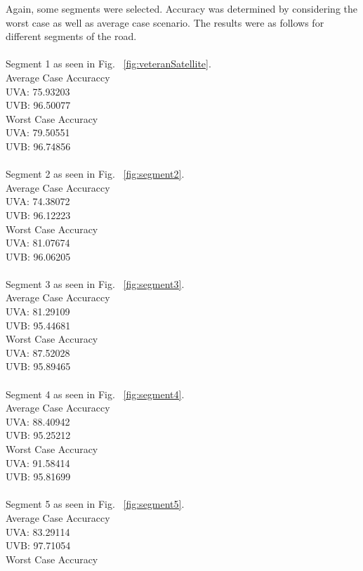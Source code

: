 \documentclass[12pt,fullpage,doublespace]{article}
\begin{document}
Again, some segments were selected. Accuracy was determined by considering the worst case as well as average case scenario. The results were as follows for different segments of the road. \\
\mbox{}\\
Segment 1 as seen in Fig. ~\ref{fig:veteranSatellite}. \\
Average Case Accuraccy\\
UVA:  75.93203\\
UVB:  96.50077\\
Worst Case Accuracy\\
UVA:  79.50551\\
UVB:  96.74856 \\
\mbox{}\\
Segment 2 as seen in Fig. ~\ref{fig:segment2}. \\
Average Case Accuraccy\\
UVA:  74.38072\\
UVB:  96.12223\\
Worst Case Accuracy\\
UVA:  81.07674\\
UVB:  96.06205\\
\mbox{}\\
Segment 3 as seen in Fig. ~\ref{fig:segment3}. \\
Average Case Accuraccy\\
UVA:  81.29109\\
UVB:  95.44681\\
Worst Case Accuracy\\
UVA:  87.52028\\
UVB:  95.89465  \\
\mbox{}\\
Segment 4 as seen in Fig. ~\ref{fig:segment4}. \\
Average Case Accuraccy\\
UVA:  88.40942\\
UVB:  95.25212\\
Worst Case Accuracy\\
UVA:  91.58414\\
UVB:  95.81699\\
\mbox{}\\
Segment 5 as seen in Fig. ~\ref{fig:segment5}. \\
Average Case Accuraccy\\
UVA:  83.29114\\
UVB:  97.71054\\
Worst Case Accuracy\\
\end{document}
